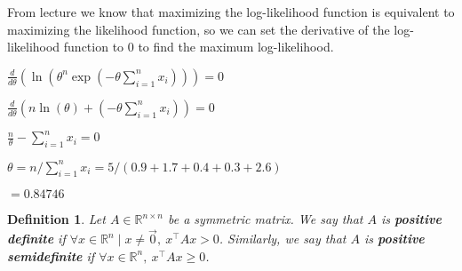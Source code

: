 \documentclass[11pt]{exam}
\theoremstyle{quest}
\newtheorem*{definition}{Definition}
\begin{document}
From lecture we know that maximizing the log-likelihood function is equivalent to maximizing the likelihood function, so we can set the derivative of the log-likelihood function to 0 to find the maximum log-likelihood.

$\frac{d}{d\theta}(\ln(\theta^n \exp(-\theta \sum_{i=1}^{n} x_i))) = 0$

$\frac{d}{d\theta}(n \ln(\theta) + (-\theta \sum_{i=1}^{n} x_i)) = 0$

$\frac{n}{\theta} - \sum_{i=1}^{n} x_i = 0$

$\theta = n/\sum_{i=1}^{n} x_i = 5/(0.9 + 1.7 + 0.4  + 0.3 + 2.6)$

$= 0.84746$


\newpage


\begin{definition}
Let $A \in \mathbb{R}^{n \times n}$ be a symmetric matrix. We say that $A$ is
\textbf{positive definite} if $\forall x\in \mathbb{R}^n \mid x \neq \vec{0},\ x^\top Ax >
0$. Similarly, we say that $A$ is \textbf{positive semidefinite} if $\forall x
\in \mathbb{R}^n,\ x^\top Ax \geq 0$.
\end{definition}

\bigskip
\end{document}
